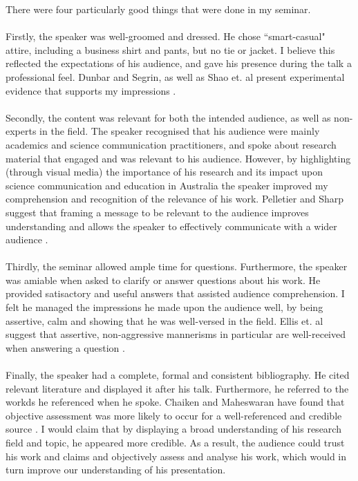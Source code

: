 There were four particularly good things that were done in my seminar.\\
\\
Firstly, the speaker was well-groomed and dressed.
He chose ``smart-casual" attire, including a business shirt and pants, but no tie or jacket.
I believe this reflected the expectations of his audience, and gave his presence during the talk a
professional feel.
Dunbar and Segrin, as well as Shao et. al present experimental evidence that supports my impressions
\cite{shao2004effects, dunbar2012clothing}.\\
\\
Secondly, the content was relevant for both the intended audience, as well as non-experts in the
field.
The speaker recognised that his audience were mainly academics and science communication
practitioners, and spoke about research material that engaged and was relevant to his audience.
However, by highlighting (through visual media) the importance of his research and its impact upon
science communication and education in Australia the speaker improved my comprehension and
recognition of the relevance of his work.
Pelletier and Sharp suggest that framing a message to be relevant to the audience improves
understanding and allows the speaker to effectively communicate with a wider audience \cite{pelletier2008persuasive}.\\
\\
Thirdly, the seminar allowed ample time for questions.
Furthermore, the speaker was amiable when asked to clarify or answer questions about his work.
He provided satisactory and useful answers that assisted audience comprehension.
I felt he managed the impressions he made upon the audience well, by being assertive, calm and
showing that he was well-versed in the field.
Ellis et. al suggest that assertive, non-aggressive mannerisms in particular are well-received when
answering a question \cite{ellis2002use}.\\
\\
Finally, the speaker had a complete, formal and consistent bibliography.
He cited relevant literature and displayed it after his talk.
Furthermore, he referred to the workds he referenced when he spoke.
Chaiken and Maheswaran have found that objective assessment was more likely to occur for a
well-referenced and credible source \cite{chaiken1994heuristic}.
I would claim that by displaying a broad understanding of his research field
and topic, he appeared more credible.
As a result, the audience could trust his work and claims and objectively assess and analyse his
work, which would in turn improve our understanding of his presentation.

